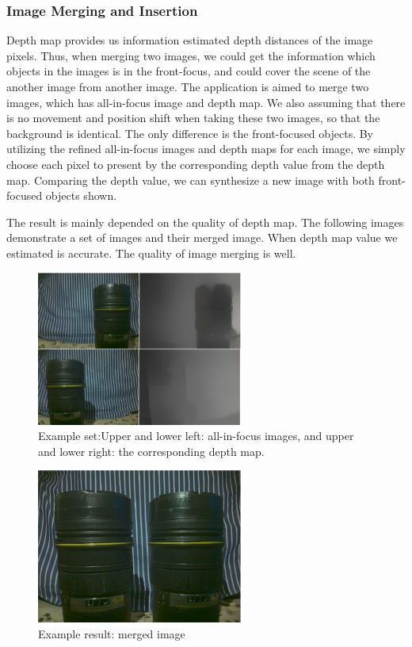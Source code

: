 \documentclass[annual, 12pt]{acmsiggraph}
\begin{document}
\subsubsection{Image Merging and Insertion}

Depth map provides us information estimated depth distances of the image pixels. Thus, when merging two images, we could get the information which objects in the images is in the front-focus, and could cover the scene of the another image from another image. The application is aimed to merge two images, which has all-in-focus image and depth map. We also assuming that there is no movement and position shift when taking these two images, so that the background is identical. The only difference is the front-focused objects. By utilizing the refined all-in-focus images and depth maps for each image, we simply choose each pixel to present by the corresponding depth value from the depth map. Comparing the depth value, we can synthesize a new image with both front-focused objects shown. 

The result is mainly depended on the quality of depth map.  The following images demonstrate a set of images and their merged image. When depth map value we estimated is accurate. The quality of image merging is well. 
\begin{figure}[h!]
   \centering
   \includegraphics[height=2.0in]{images/merged1}
   \caption{Example set:Upper and lower left: all-in-focus images, and upper and lower right: the corresponding depth map. }
\end{figure}

\begin{figure}[h!]
   \centering
   \includegraphics[height=2.0in]{images/merged}
   \caption{Example result: merged image}
\end{figure}
\end{document}

